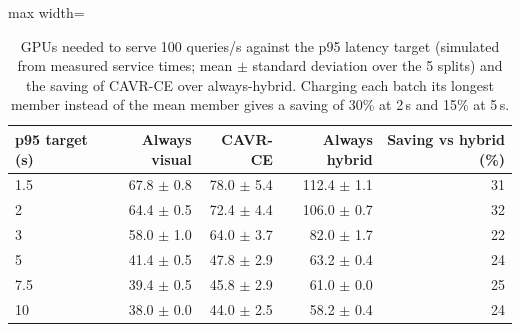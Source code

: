 \begin{table}[t]
\centering
\caption{GPUs needed to serve 100 queries/s against the p95 latency target (simulated from measured service times; mean $\pm$ standard deviation over the 5 splits) and the saving of CAVR-CE over always-hybrid. Charging each batch its longest member instead of the mean member gives a saving of 30\% at 2\,s and 15\% at 5\,s.}
\label{tab:slo_sweep}
\begin{adjustbox}{max width=\linewidth}
\begin{tabular}{lrrrr}
\toprule
\textbf{p95 target (s)} & \textbf{Always visual} & \textbf{CAVR-CE} & \textbf{Always hybrid} & \textbf{Saving vs hybrid (\%)} \\
\midrule
1.5 & 67.8 $\pm$ 0.8 & 78.0 $\pm$ 5.4 & 112.4 $\pm$ 1.1 & 31 \\
2 & 64.4 $\pm$ 0.5 & 72.4 $\pm$ 4.4 & 106.0 $\pm$ 0.7 & 32 \\
3 & 58.0 $\pm$ 1.0 & 64.0 $\pm$ 3.7 & 82.0 $\pm$ 1.7 & 22 \\
5 & 41.4 $\pm$ 0.5 & 47.8 $\pm$ 2.9 & 63.2 $\pm$ 0.4 & 24 \\
7.5 & 39.4 $\pm$ 0.5 & 45.8 $\pm$ 2.9 & 61.0 $\pm$ 0.0 & 25 \\
10 & 38.0 $\pm$ 0.0 & 44.0 $\pm$ 2.5 & 58.2 $\pm$ 0.4 & 24 \\
\bottomrule
\end{tabular}
\end{adjustbox}
\end{table}
